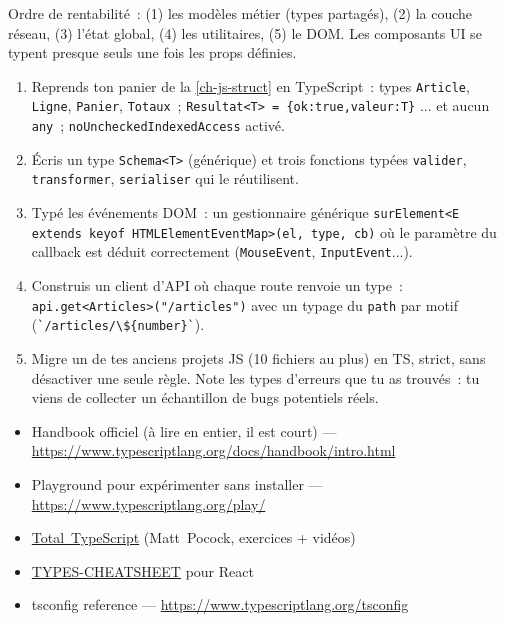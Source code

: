 \documentclass[12pt,a4paper,twoside,openright]{book}
\newcommand{\link}[2]{\href{#2}{#1}}
\begin{document}
Ordre de rentabilit\'e~: (1) les mod\`eles m\'etier (types partag\'es), (2) la couche r\'eseau,
(3) l'\'etat global, (4) les utilitaires, (5) le DOM. Les composants UI se typent presque seuls
une fois les props d\'efinies.

\begin{exercice}
\begin{enumerate}
  \item Reprends ton panier de la \cref{ch-js-struct} en TypeScript~: types \verb|Article|,
        \verb|Ligne|, \verb|Panier|, \verb|Totaux|~; \verb|Resultat<T> = {ok:true,valeur:T}| ...
        et aucun \verb|any|~; \verb|noUncheckedIndexedAccess| activ\'e.
  \item \'Ecris un type \verb|Schema<T>| (g\'en\'erique) et trois fonctions typ\'ees
        \verb|valider|, \verb|transformer|, \verb|serialiser| qui le r\'eutilisent.
  \item Typ\'e les \'ev\'enements DOM~: un gestionnaire g\'en\'erique
        \verb|surElement<E extends keyof HTMLElementEventMap>(el, type, cb)| o\`u le param\`etre du
        callback est d\'eduit correctement (\verb|MouseEvent|, \verb|InputEvent|...).
  \item Construis un client d'API o\`u chaque route renvoie un type~: \verb|api.get<Articles>("/articles")|
        avec un typage du \verb|path| par motif (\verb|`/articles/\${number}`|).
  \item Migre un de tes anciens projets JS (10 fichiers au plus) en TS, strict, sans
        d\'esactiver une seule r\`egle. Note les types d'erreurs que tu as trouv\'es~: tu viens de
        collecter un \'echantillon de bugs potentiels r\'eels.
\end{enumerate}
\end{exercice}

\begin{ressources}
\begin{itemize}
  \item Handbook officiel (\`a lire en entier, il est court) --- \url{https://www.typescriptlang.org/docs/handbook/intro.html}
  \item Playground pour exp\'erimenter sans installer --- \url{https://www.typescriptlang.org/play/}
  \item \link{Total~TypeScript}{https://www.totaltypescript.com/} (Matt~Pocock, exercices + vid\'eos)
  \item \link{TYPES-CHEATSHEET}{https://github.com/typescript-cheatsheets/react} pour React
  \item tsconfig reference --- \url{https://www.typescriptlang.org/tsconfig}
\end{itemize}
\end{ressources}
\end{document}
